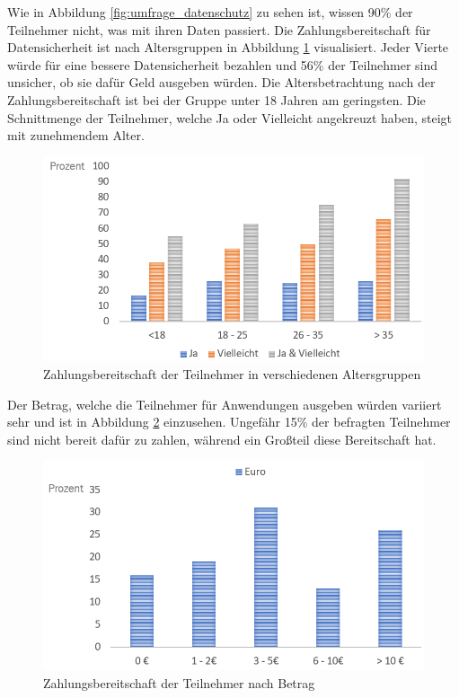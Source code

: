 \newpage

Wie in Abbildung \ref{fig:umfrage_datenschutz} zu sehen ist, wissen 90\% der Teilnehmer nicht, was mit ihren Daten passiert. Die Zahlungsbereitschaft für Datensicherheit ist nach Altersgruppen in Abbildung \ref{fig:umfrage_geld_gruppen} visualisiert. Jeder Vierte würde für eine bessere Datensicherheit bezahlen und 56\% der Teilnehmer sind unsicher, ob sie dafür Geld ausgeben würden. Die Altersbetrachtung nach der Zahlungsbereitschaft ist bei der Gruppe unter 18 Jahren am geringsten. Die Schnittmenge der Teilnehmer, welche \glqq Ja\grqq{} oder \glqq Vielleicht\grqq{} angekreuzt haben, steigt mit zunehmendem Alter.

\begin{figure}[!h]
	\centering
	\includegraphics[width=0.9\linewidth]{Picture/umfrage_geld_gruppen}
	\caption[Zahlungsbereitschaft der Teilnehmer in verschiedenen Altersgruppen]{Zahlungsbereitschaft der Teilnehmer in verschiedenen Altersgruppen}
	\label{fig:umfrage_geld_gruppen}
\end{figure}

Der Betrag, welche die Teilnehmer für Anwendungen ausgeben würden variiert sehr und ist in Abbildung \ref{fig:umfrage_betrag} einzusehen. Ungefähr 15\% der befragten Teilnehmer sind nicht bereit dafür zu zahlen, während ein Großteil diese Bereitschaft hat.

\begin{figure}[!h]
	\centering
	\includegraphics[width=0.9\linewidth]{Picture/umfrage_betrag}
	\caption[Zahlungsbereitschaft der Teilnehmer nach Betrag]{Zahlungsbereitschaft der Teilnehmer nach Betrag}
	\label{fig:umfrage_betrag}
\end{figure}

